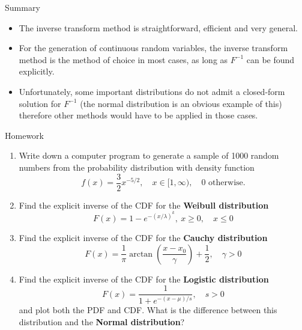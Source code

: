\documentclass[8pt]{beamer}
\begin{document}
\begin{frame}{Summary}
\begin{itemize}

\item The inverse transform method is straightforward, efficient and very general.

\item For the generation of continuous random variables, the inverse transform method is the method of choice in most cases, as long as $F^{-1}$ can be found explicitly.

\item Unfortunately, some important distributions do not admit a closed-form solution for $F^{-1}$ (the normal distribution is an obvious example of this) therefore other methods would have to be applied in those cases.

\end{itemize}
\end{frame}


\begin{frame}{Homework}
\begin{enumerate}
\item Write down a computer program to generate a sample of 1000 random numbers from the probability distribution with density function 
\begin{equation*}
f(x) = \frac{3}{2} x^{-5/2}, \quad x \in [1, \infty), \quad 0 \text{ otherwise.}
\end{equation*}

\item Find the explicit inverse of the CDF for the \textbf{Weibull distribution} $$F(x) = 1 - e^{-(x/\lambda)^k}, \ x \ge 0, \quad x \leq 0$$

\item Find the explicit inverse of the CDF for the \textbf{Cauchy distribution} $$F(x) = \frac{1}{\pi} \arctan\left(\frac{x-x_0}{\gamma}\right) + \frac{1}{2}, \quad \gamma>0$$ 

\item Find the explicit inverse of the CDF for the \textbf{Logistic distribution} $$F(x) = \frac{1}{1 + e^{-(x-\mu)/s}}, \quad s > 0$$ and plot both the PDF and CDF. What is the difference between this distribution and the \textbf{Normal distribution}?
\end{enumerate}



\end{frame}
\end{document}
